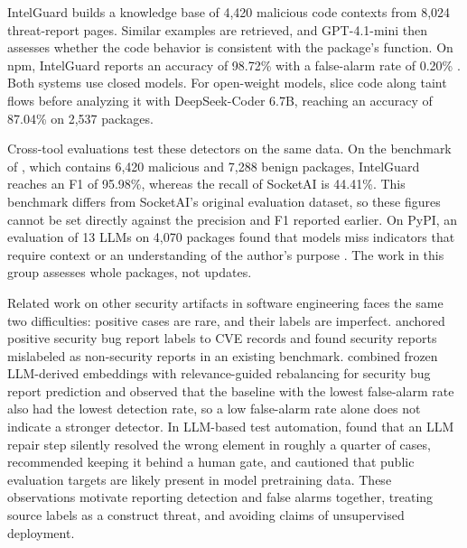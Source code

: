 \documentclass[a4paper,fleqn]{cas-dc}
\begin{document}
IntelGuard builds a knowledge base of 4,420 malicious code contexts from 8,024
threat-report pages. Similar examples are retrieved, and GPT-4.1-mini then
assesses whether the code behavior is consistent with the package's function. On
npm, IntelGuard reports an accuracy of 98.72\% with a false-alarm rate of 0.20\%
\citep{guo2026bridging}. Both systems use closed models. For open-weight
models, \citet{nguyen2025taint} slice code along taint flows before
analyzing it with DeepSeek-Coder 6.7B, reaching an accuracy of 87.04\% on 2,537
packages.

Cross-tool evaluations test these detectors on the same data. On the benchmark of
\citet{guo2026effective}, which contains 6,420 malicious and 7,288 benign
packages, IntelGuard reaches an F1 of 95.98\%, whereas the recall of
SocketAI is 44.41\%. This benchmark differs from SocketAI's original evaluation
dataset, so these figures cannot be set directly against the precision and F1
reported earlier. On PyPI, an evaluation of 13 LLMs on 4,070 packages found that
models miss indicators that require context or an understanding of the author's
purpose \citep{ryan2026evaluation}. The work in this group assesses whole
packages, not updates.

Related work on other security artifacts in software engineering faces the same
two difficulties: positive cases are rare, and their labels are imperfect.
\citet{wu2020cve} anchored positive security bug report labels to CVE records
and found security reports mislabeled as non-security reports in an existing
benchmark. \citet{jamwal2027llmsec} combined frozen LLM-derived embeddings with
relevance-guided rebalancing for security bug report prediction and observed that
the baseline with the lowest false-alarm rate also had the lowest detection rate,
so a low false-alarm rate alone does not indicate a stronger detector. In LLM-based
test automation, \citet{malhotra2027llm} found that an LLM repair step silently
resolved the wrong element in roughly a quarter of cases, recommended keeping it
behind a human gate, and cautioned that public evaluation targets are likely
present in model pretraining data. These observations motivate reporting
detection and false alarms together, treating source labels as a construct
threat, and avoiding claims of unsupervised deployment.
\end{document}
